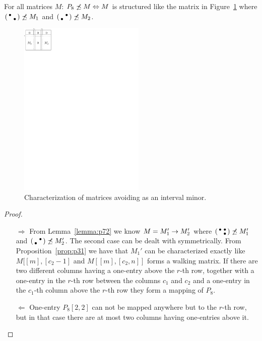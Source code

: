 \begin{prop}
\label{prop:p72}
For all matrices $M$: $P_8\not\preceq M\Leftrightarrow M$ is structured like the matrix in Figure~\ref{fig:p72} where $\left(\begin{smallmatrix}\bullet& \\ &\bullet\end{smallmatrix}\right)\not\preceq M_1$ and $\left(\begin{smallmatrix} &\bullet\\\bullet& \end{smallmatrix}\right)\not\preceq M_2$.
\end{prop}
\begin{figure}[!ht]
\centering
\includegraphics[width=60mm]{img/p72.pdf}
\caption{Characterization of matrices avoiding \usebox{\smlmatc} as an interval minor.}
\label{fig:p72}
\end{figure}
\begin{proof}
\begin{itemize}
	\item[$\Rightarrow$] From Lemma~\ref{lemma:p72} we know $M=M_1'\rightarrow M_2'$ where $\left(\begin{smallmatrix}\bullet&\bullet\\ &\bullet\end{smallmatrix}\right)\not\preceq M_1'$ and $\left(\begin{smallmatrix} &\bullet\\\bullet& \end{smallmatrix}\right)\not\preceq M_2'$. The second case can be dealt with symmetrically. From Proposition~\ref{prop:p31} we have that $M_1'$ can be characterized exactly like $M[[m],[c_2-1]$ and $M[[m],[c_2,n]]$ forms a walking matrix. If there are two different columns having a one-entry above the $r$-th row, together with a one-entry in the $r$-th row between the columns $c_1$ and $c_2$ and a one-entry in the $c_1$-th column above the $r$-th row they form a mapping of $P_8$.
	\item[$\Leftarrow$] One-entry $P_8[2,2]$ can not be mapped anywhere but to the $r$-th row, but in that case there are at most two columns having one-entries above it.
\end{itemize}
\end{proof}

